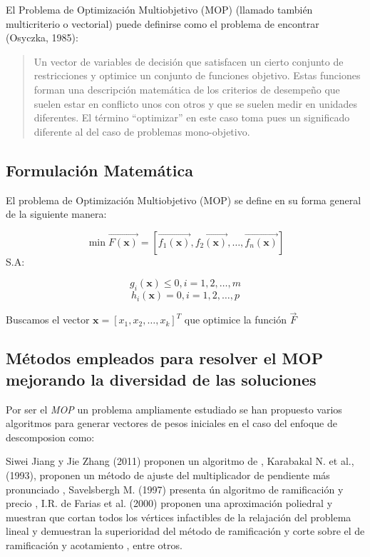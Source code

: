 \documentclass[letterpaper,10pt]{article}
\begin{document}
El Problema de Optimización Multiobjetivo (MOP) (llamado también
multicriterio o vectorial) puede definirse como el problema de
encontrar (Osyczka, 1985)\cite{Osyczka1985193}:
\begin{quote}
Un vector de variables de decisión que satisfacen un cierto
conjunto de restricciones y optimice un conjunto de funciones
objetivo. Estas funciones forman una descripción matemática
de los criterios de desempeño que suelen estar en conflicto
unos con otros y que se suelen medir en unidades diferentes.
El término ``optimizar'' en este caso toma pues un significado
diferente al del caso de problemas mono-objetivo.
\end{quote}

\newpage
\subsection{Formulación Matemática}
El problema de Optimización Multiobjetivo (MOP) se define en su forma general de la siguiente manera:
 
$$\min \overrightarrow{F(\bm{x})} = \left[ \overrightarrow{f_1(\bm{x})}, \overrightarrow{f_2(\bm{x})} , \dots, \overrightarrow{f_n(\bm{x})} \right] $$
S.A:
 
$$g_i(\bm{x}) \leq 0, i=1,2,\dots,m$$
$$h_i(\bm{x}) = 0, i=1,2,\dots,p$$
 
Buscamos el vector $\bm{x}=[x_1,x_2,\dots,x_k]^T$ que optimice la función $\overrightarrow{F}$

 
\subsection{Métodos empleados para resolver el MOP mejorando la diversidad de las soluciones}

Por ser el \emph{MOP} un problema ampliamente estudiado se han propuesto varios algoritmos para generar vectores de pesos iniciales en el caso del enfoque de descomposion como:
\newline

Siwei Jiang y Jie Zhang (2011) proponen un algoritmo de  \cite{mie99}, Karabakal N. et al., (1993), proponen un método de ajuste del multiplicador de pendiente más pronunciado \cite{4358754}, Savelsbergh M. (1997) presenta ún algoritmo de ramificación y precio \cite{4358754}, I.R. de Farias et al. (2000) proponen una aproximación poliedral y muestran que cortan todos los vértices infactibles de la relajación del problema lineal y demuestran la superioridad del método de ramificación y corte sobre el de ramificación y acotamiento \cite{4358754}, entre otros.
\newline
\end{document}
